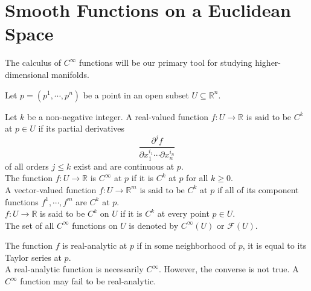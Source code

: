 \documentclass[en, oneside]{vivi}
\begin{document}
\section{Smooth Functions on a Euclidean Space}
The calculus of $C^\infty$ functions will be our primary tool for studying higher-dimensional manifolds.


Let $p = (p^1, \cdots, p^n)$ be a point in an open subset $U \subseteq \mathbb{R}^n$. 
\begin{dfn}
    Let $k$ be a non-negative integer. A real-valued function $f: U \to \mathbb{R}$ is said to be $C^k$ at $p \in U$ if its partial derivatives
    \begin{equation*}
        \frac{\partial^j f}{\partial x_1^{i_1} \cdots \partial x_n^{i_n}}
    \end{equation*}
    of all orders $j \leq k$ exist and are continuous at $p$.\\
    The function $f: U \to \mathbb{R}$ is $C^\infty$ at $p$ if it is $C^k$ at $p$ for all $k \geq 0$.\\
    A vector-valued function $f: U \to \mathbb{R}^m$ is said to be $C^k$ at $p$ if all of its component functions $f^1, \cdots, f^m$ are $C^k$ at $p$.\\
    $f: U \to \mathbb{R}$ is said to be $C^k$ on $U$ if it is $C^k$ at every point $p \in U$.\\
    The set of all $C^\infty$ functions on $U$ is denoted by $C^\infty(U)$ or $\mathcal{F}(U)$.
\end{dfn}
The function $f$ is real-analytic at $p$ if in some neighborhood of $p$, it is equal to its Taylor series at $p$.\\
A real-analytic function is necessarily $C^\infty$. However, the converse is not true. A $C^\infty$ function may fail to be real-analytic.
\end{document}
